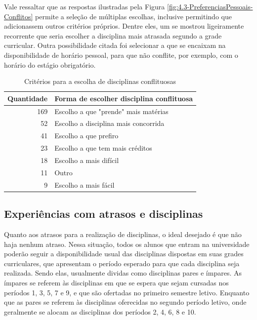         Vale ressaltar que as respostas ilustradas pela Figura \ref{fig:4.3-PreferenciasPessoais-Conflitos} permite a seleção de múltiplas escolhas, inclusive permitindo que adicionassem outros critérios próprios. Dentre eles, um se mostrou ligeiramente recorrente que seria escolher a disciplina mais atrasada segundo a grade curricular. Outra possibilidade citada foi selecionar a que se encaixam na disponibilidade de horário pessoal, para que não conflite, por exemplo, com o horário do estágio obrigatório.

        \begin{table}[htbp]
            \centering
            \caption{\label{table:4.3-PreferenciasPessoais-Conflitos}Critérios para a escolha de disciplinas conflituosas}
            \begin{tabular}{| r l |}
                \hline
                    \textbf{Quantidade} & \textbf{Forma de escolher disciplina conflituosa} \\
                \hline
                    169 & Escolho a que "prende" mais matérias \\
                     52 & Escolho a disciplina mais concorrida \\
                     41 & Escolho a que prefiro                \\
                     23 & Escolho a que tem mais créditos      \\
                     18 & Escolho a mais difícil               \\
                     11 & Outro                                \\
                      9 & Escolho a mais fácil                 \\
                \hline
            \end{tabular}
        \end{table}

    \subsection{Experiências com atrasos e disciplinas} %

        Quanto aos atrasos para a realização de disciplinas, o ideal desejado é que não haja nenhum atraso. Nessa situação, todos os alunos que entram na universidade poderão seguir a disponibilidade usual das disciplinas dispostas em suas grades curriculares, que apresentam o período esperado para que cada disciplina seja realizada. Sendo elas, usualmente dividas como disciplinas pares e ímpares. As ímpares se referem às disciplinas em que se espera que sejam cursadas nos períodos 1, 3, 5, 7 e 9, e que são ofertadas no primeiro semestre letivo. Enquanto que as pares se referem às disciplinas oferecidas no segundo período letivo, onde geralmente se alocam as disciplinas dos períodos 2, 4, 6, 8 e 10.

